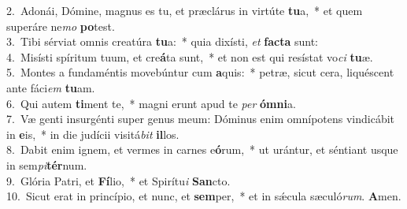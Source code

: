 {2.~}Adonái, Dómine, magnus es tu, et præclárus in virtúte \textbf{tu}a,~* et quem superáre ne\textit{mo} \textbf{po}test.\\
{3.~}Tibi sérviat omnis creatúra \textbf{tu}a:~* quia dixísti, \textit{et} \textbf{fa}\textbf{cta} sunt:\\
{4.~}Misísti spíritum tuum, et cre\textbf{á}ta sunt,~* et non est qui resístat vo\textit{ci} \textbf{tu}æ.\\
{5.~}Montes a fundaméntis movebúntur cum \textbf{a}quis:~* petræ, sicut cera, liquéscent ante fáci\textit{em} \textbf{tu}am.\\
{6.~}Qui autem \textbf{ti}ment te,~* magni erunt apud te \textit{per} \textbf{óm}\textbf{ni}a.\\
{7.~}Væ genti insurgénti super genus meum: Dóminus enim omnípotens vindicábit in \textbf{e}is,~* in die judícii visitá\textit{bit} \textbf{il}los.\\
{8.~}Dabit enim ignem, et vermes in carnes e\textbf{ó}rum,~* ut urántur, et séntiant usque in sem\textit{pi}\textbf{tér}num.\\
{9.~}Glória Patri, et \textbf{Fí}lio,~* et Spirítu\textit{i} \textbf{San}cto.\\
{10.~}Sicut erat in princípio, et nunc, et \textbf{sem}per,~* et in sǽcula sæculó\textit{rum}. \textbf{A}men.\\
